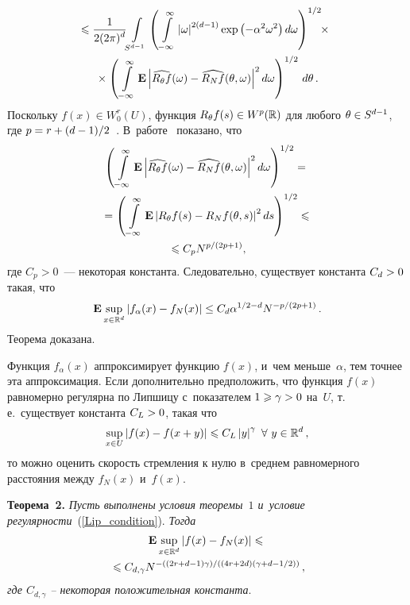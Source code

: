 \begin{multicols}{2}
\noindent
\begin{multline*}
\hspace*{-4pt}{}\leqslant\displaystyle\frac{\displaystyle 1\mathstrut}{\displaystyle 2(2\pi)^{d}\mathstrut}\!\int\limits_{S^{d-1}}\left(
\int\limits_{\,-\infty}^{\infty}\left\vert\omega\right\vert^{2(d-1)}
\exp\left(-\alpha^2\omega^2\right)d\omega\right)^{1/2}\!\!\times{}\\
{}\times \left(
\int\limits_{\,-\infty}^{\infty}\mathbf{E}
\left\vert\widehat{R_\theta f}(\omega)-\widehat{R_N f}(\theta,\omega)\right\vert^2d
\omega\right)^{1/2}\, d\theta\,.
\end{multline*}
Поскольку $f(x)\in W^r_0(U)$, функция $R_\theta f(s)\hm\in W^{p}(\mathbb{R})$ для
любого $\theta\hm\in S^{d-1}$, где $p\hm=r\hm+(d-1)/2$~\cite{14-sh}.
В~работе~\cite{8-sh} показано, что
\begin{multline*}
\left(\int\limits_{\,-\infty}^{\infty}\mathbf{E}
\left\vert\widehat{R_\theta f}(\omega)-\widehat{R_N f}(\theta,\omega)\right\vert^2d
\omega\right)^{1/2}={}\\
{}=
\left(\int\limits_{\,-\infty}^{\infty}\mathbf{E}
\left\vert R_\theta f(s)-R_N f(\theta,s)\right\vert^2ds\right)^{1/2}
\leqslant{}\\
{}\leqslant C_p N^{{p}/(2p+1)},
\end{multline*}
где $C_p>0$~--- некоторая константа. Следовательно, существует константа $C_d\hm>0$
такая, что
\begin{equation*}
\mathbf{E}\sup\limits_{x\in \mathbb{R}^d}
\left\vert f_\alpha(x)-f_{N}(x)\right\vert\leq C_d\alpha^{1/2-d}N^{-{p}/(2p+1)}\,.
\end{equation*}
Теорема доказана.

\smallskip

Функция $f_\alpha(x)$ аппроксимирует функцию $f(x)$, и~чем меньше~$\alpha$, тем
точнее эта аппроксимация. Если дополнительно предположить, что функция $f(x)$
равномерно регулярна по Липшицу с~показателем $1\hm\geqslant\gamma\hm>0$ на~$U$,
т.\,е.\ существует константа $C_L\hm>0$, такая что
\begin{equation}
\label{Lip_condition}
\sup\limits_{x\in U}\left\vert f(x)-f(x+y)\right\vert\leqslant
C_L\left\vert y\right\vert^{\gamma}\ \forall\ y\in\mathbb{R}^d\,,
\end{equation}
то можно оценить скорость стремления к нулю в~среднем равномерного
расстояния между $f_{N}(x)$ и~$f(x)$.

\smallskip

\noindent
\textbf{Теорема~2.} \textit{Пусть выполнены условия теоремы~$1$
и~условие регулярности}~(\ref{Lip_condition}).
\textit{Тогда}
\begin{multline}
\label{Uniform_distance}
\mathbf{E}\sup\limits_{x\in \mathbb{R}^d}
\left\vert f(x)-f_{N}(x)\right\vert\leqslant{}\\
{}\leqslant C_{d,\gamma}N^{-({(2r+d-1)\gamma})/((4r+2d)(\gamma+d-1/2))}\,,
\end{multline}
\textit{где $C_{d,\gamma}$ -- некоторая положительная константа}.


\end{multicols}
